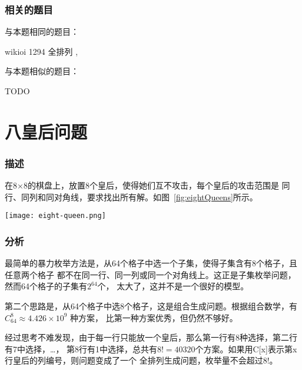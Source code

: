 \subsubsection{相关的题目}
与本题相同的题目：
\begindot
\item wikioi 1294 全排列 , 
\myenddot

与本题相似的题目：
\begindot
\item TODO
\myenddot


\section{八皇后问题} %

\subsubsection{描述}
在8×8的棋盘上，放置8个皇后，使得她们互不攻击，每个皇后的攻击范围是
同行、同列和同对角线，要求找出所有解。如图~\ref{fig:eightQueens}所示。

\begin{center}
\texttt{[image: eight-queen.png]} \\
\label{fig:eightQueens}
\end{center}

\subsubsection{分析}
最简单的暴力枚举方法是，从64个格子中选一个子集，使得子集含有8个格子，且任意两个格子
都不在同一行、同一列或同一个对角线上。这正是子集枚举问题，然而64个格子的子集有$2^{64}$个，
太大了，这并不是一个很好的模型。

第二个思路是，从64个格子中选8个格子，这是组合生成问题。根据组合数学，有 $C_{64}^{8} \approx 4.426 \times 10^9$ 种方案，
比第一种方案优秀，但仍然不够好。

经过思考不难发现，由于每一行只能放一个皇后，那么第一行有8种选择，第二行有7中选择，…，
第8行有1中选择，总共有$8!=40320$个方案。如果用C[x]表示第x行皇后的列编号，则问题变成了一个
全排列生成问题，枚举量不会超过8!。

